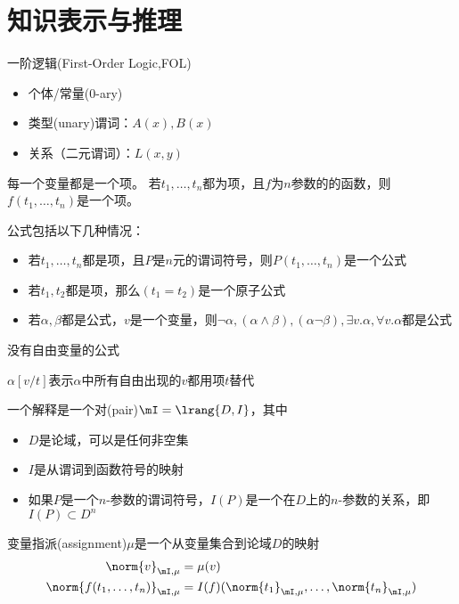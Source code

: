 
\section{知识表示与推理}
一阶逻辑(First-Order Logic,FOL)
\begin{itemize}
	\item 个体/常量(0-ary)
	\item 类型(unary)谓词：$A(x),B(x)$
	\item 关系（二元谓词）：$L(x,y)$
\end{itemize}

\begin{definition}[项(term)]
每一个变量都是一个项。
若$t_1,\ldots,t_n$都为项，且$f$为$n$参数的的函数，则$f(t_1,\ldots,t_n)$是一个项。
\end{definition}
\begin{definition}[公式(formular)]
公式包括以下几种情况：
\begin{itemize}
\item 若$t_1,\ldots,t_n$都是项，且$P$是$n$元的谓词符号，则$P(t_1,\ldots,t_n)$是一个公式
\item 若$t_1,t_2$都是项，那么$(t_1=t_2)$是一个原子公式
\item 若$\alpha,\beta$都是公式，$v$是一个变量，则$\lnot\alpha,(\alpha\land\beta),(\alpha\lnot\beta),\exists v.\alpha,\forall v.\alpha$都是公式
\end{itemize}
\end{definition}
\begin{definition}[句子(sentence)]
没有自由变量的公式
\end{definition}
\begin{definition}[替换]
$\alpha[v/t]$表示$\alpha$中所有自由出现的$v$都用项$t$替代
\end{definition}
\begin{definition}[解释(interpretation)]
一个解释是一个对(pair)$\mI=\lrang{D,I}$，其中
\begin{itemize}
	\item $D$是论域，可以是任何非空集
	\item $I$是从谓词到函数符号的映射
	\item 如果$P$是一个$n$-参数的谓词符号，$I(P)$是一个在$D$上的$n$-参数的关系，即$I(P)\subset D^n$
\end{itemize}
\end{definition}
\begin{definition}[赋值(denotation)]
变量指派(assignment)$\mu$是一个从变量集合到论域$D$的映射
\[\begin{aligned}
\norm{v}_{\mI,\mu}&=\mu(v)\\
\norm{f(t_1,\ldots,t_n)}_{\mI,\mu}&=I(f)(\norm{t_1}_{\mI,\mu},\ldots,\norm{t_n}_{\mI,\mu})
\end{aligned}\]
\end{definition}
